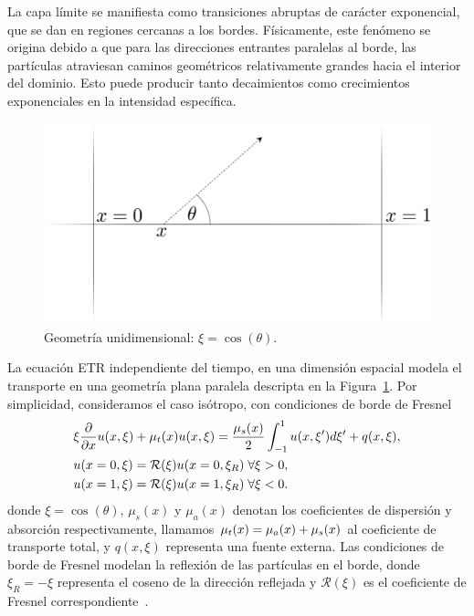 La capa límite se manifiesta como transiciones abruptas de 
 carácter exponencial, que se dan en regiones cercanas a los bordes. 
Físicamente, este fenómeno se origina debido a que para las direcciones entrantes paralelas 
al borde, las partículas atraviesan caminos geométricos relativamente grandes 
hacia el interior del dominio. Esto puede producir tanto decaimientos 
como crecimientos exponenciales en la intensidad específica.
\begin{figure}[h!]
\centering
  \includegraphics[width=0.5\linewidth]{figuras/geom.pdf}
  \caption{Geometría unidimensional: $\xi = \cos(\theta)$.}
 \label{fig:parallelgeom}
\end{figure}
La ecuación ETR independiente del tiempo, en una dimensión espacial 
modela el transporte en una geometría plana paralela descripta en la 
Figura~\ref{fig:parallelgeom}. Por simplicidad, consideramos 
el caso isótropo, con condiciones de borde de Fresnel
\begin{equation}
\begin{split}
  &\xi \frac{\partial}{\partial x}u(x,\xi)+\mu_t(x)u(x,\xi)=   \frac{\mu_s(x)}{2} \int_{-1}^{1}u(x,\xi') d\xi' +q(x,\xi),\\
  &u(x=0,\xi)=\mathcal{R}(\xi)u(x=0,\xi_R) \; \forall \xi>0,\\
  &u(x=1,\xi)=\mathcal{R}(\xi)u(x=1,\xi_R) \; \forall \xi<0.
\end{split}
\label{eq:transp1d}
\end{equation}
donde $\xi=\cos(\theta)$,  $\mu_s(x)$ y $\mu_a(x)$ denotan 
los coeficientes de dispersión y absorción respectivamente, 
llamamos $\mu_t(x)=\mu_a(x)+\mu_s(x)$ al coeficiente de transporte 
total, y $q(x,\xi)$ representa una fuente externa. Las condiciones de 
borde de Fresnel modelan la reflexión de las partículas en el borde, 
donde $\xi_R=-\xi$ representa el coseno de la dirección reflejada 
y $\mathcal{R}(\xi)$ es el coeficiente de Fresnel correspondiente~\cite{Born1999}.


